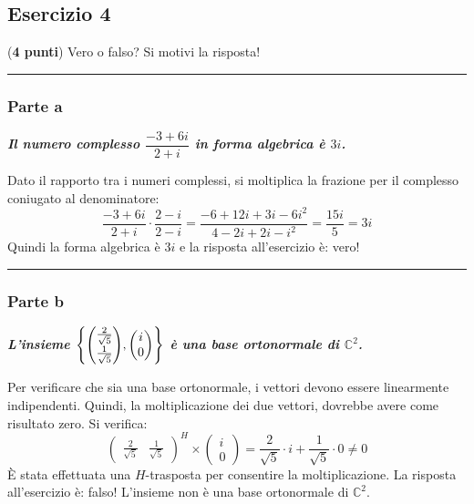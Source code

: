 \documentclass[a4paper]{article}
\makeatletter
\newcommand{\longline}{\noindent\rule{\textwidth}{0.4pt}}
\newenvironment{rowequmat}[1]{\left(\array{@{}#1@{}}}{\endarray\right)}
\makeatother
\begin{document}
	\subsection{Esercizio 4}

	(\textbf{4 punti}) Vero o falso? Si motivi la risposta!\newline

	\longline

	\subsubsection{Parte a}

	\textcolor{Green4}{\textbf{\emph{Il numero complesso $\dfrac{-3+6i}{2+i}$ in forma algebrica è $3i$.}}}\newline

	\noindent
	Dato il rapporto tra i numeri complessi, si moltiplica la frazione per il complesso coniugato al denominatore:
	\begin{equation*}
		\dfrac{-3+6i}{2+i} \cdot \dfrac{2-i}{2-i} = \dfrac{-6+12i+3i-6i^{2}}{4-2i+2i-i^{2}} = \dfrac{15i}{5} = 3i
	\end{equation*}
	Quindi la forma algebrica è $3i$ e la risposta all'esercizio è: vero!\newline

	\longline

	\subsubsection{Parte b}

	\textcolor{Green4}{\textbf{\emph{L'insieme $\left\{\begin{rowequmat}{c}
		\frac{2}{\sqrt{5}} \\ [.3em]
		\frac{1}{\sqrt{5}}
	\end{rowequmat}, \begin{pmatrix}
		i \\ 0
	\end{pmatrix}\right\}$ è una base ortonormale di $\mathbb{C}^{2}$.}}}\newline

	\noindent
	Per verificare che sia una base ortonormale, i vettori devono essere linearmente indipendenti. Quindi, la moltiplicazione dei due vettori, dovrebbe avere come risultato zero. Si verifica:
	\begin{equation*}
		\begin{pmatrix}
			\frac{2}{\sqrt{5}} & \frac{1}{\sqrt{5}}
		\end{pmatrix}^{H}
		\times
		\begin{pmatrix}
			i \\ 0
		\end{pmatrix} =
			\dfrac{2}{\sqrt{5}} \cdot i + \dfrac{1}{\sqrt{5}} \cdot 0 \ne 0
	\end{equation*}
	È stata effettuata una $H$-trasposta per consentire la moltiplicazione. La risposta all'esercizio è: falso! L'insieme non è una base ortonormale di $\mathbb{C}^{2}$.\newline
\end{document}
